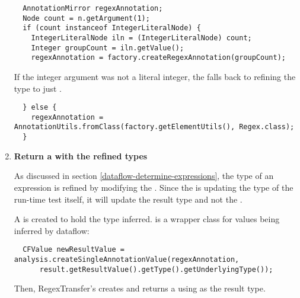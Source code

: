 \begin{enumerate}
\begin{smaller}
  \begin{Verbatim}
  AnnotationMirror regexAnnotation;
  Node count = n.getArgument(1);
  if (count instanceof IntegerLiteralNode) {
    IntegerLiteralNode iln = (IntegerLiteralNode) count;
    Integer groupCount = iln.getValue();
    regexAnnotation = factory.createRegexAnnotation(groupCount);

\end{Verbatim}
\end{smaller}

If the integer argument was not a literal integer, the
 falls back to refining the type to just
.

\begin{smaller}
\begin{Verbatim}
  } else {
    regexAnnotation = AnnotationUtils.fromClass(factory.getElementUtils(), Regex.class);
  }
\end{Verbatim}
\end{smaller}

\item \textbf{Return a  with the
    refined types}

As discussed in section \ref{dataflow-determine-expressions}, the type of an
expression is refined by modifying the
.  Since the
 is updating the type of the run-time
test itself, it will update the result type and not the
.

A  is created to hold the type inferred.
 is a wrapper class for values being inferred
by dataflow:
\begin{smaller}
\begin{Verbatim}
  CFValue newResultValue = analysis.createSingleAnnotationValue(regexAnnotation,
      result.getResultValue().getType().getUnderlyingType());
\end{Verbatim}
\end{smaller}

Then, RegexTransfer's  creates and returns a
 using  as the
result type.


\end{enumerate}
